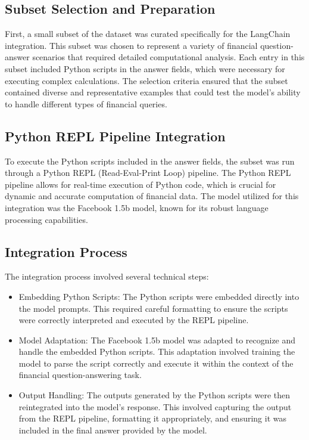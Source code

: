 \documentclass[logo,msc]{infthesis}           %
\begin{document}
\subsection{Subset Selection and Preparation}
First, a small subset of the dataset was curated specifically for the LangChain integration. This subset was chosen to represent a variety of financial question-answer scenarios that required detailed computational analysis. Each entry in this subset included Python scripts in the answer fields, which were necessary for executing complex calculations. The selection criteria ensured that the subset contained diverse and representative examples that could test the model’s ability to handle different types of financial queries.

\subsection{Python REPL Pipeline Integration}
To execute the Python scripts included in the answer fields, the subset was run through a Python REPL (Read-Eval-Print Loop) pipeline. The Python REPL pipeline allows for real-time execution of Python code, which is crucial for dynamic and accurate computation of financial data. The model utilized for this integration was the Facebook 1.5b model, known for its robust language processing capabilities.

\subsection{Integration Process}

The integration process involved several technical steps:

\begin{itemize}
    \item Embedding Python Scripts: The Python scripts were embedded directly into the model prompts. This required careful formatting to ensure the scripts were correctly interpreted and executed by the REPL pipeline.
    \item Model Adaptation: The Facebook 1.5b model was adapted to recognize and handle the embedded Python scripts. This adaptation involved training the model to parse the script correctly and execute it within the context of the financial question-answering task.
    \item Output Handling: The outputs generated by the Python scripts were then reintegrated into the model’s response. This involved capturing the output from the REPL pipeline, formatting it appropriately, and ensuring it was included in the final answer provided by the model.
\end{itemize}
\end{document}
